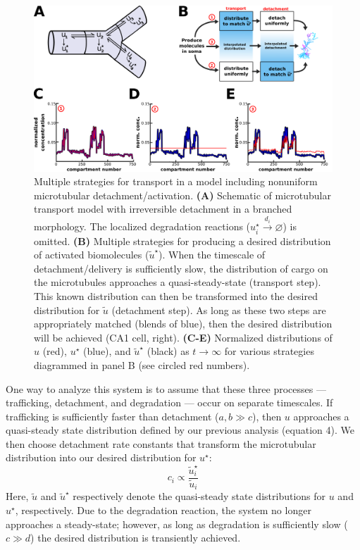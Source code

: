 \documentclass[11pt]{wlpeerj}
\begin{document}
\begin{figure}[!tb]
\begin{center}
\includegraphics[width=0.9\columnwidth]{04_sushi_belt.png}
\caption{Multiple strategies for transport in a model including nonuniform microtubular detachment/activation.
\textbf{(A)} Schematic of microtubular transport model with irreversible detachment in a branched morphology. The localized degradation reactions ($u^{\star}_i \xrightarrow{d_i} \varnothing$) is omitted.
\textbf{(B)} Multiple strategies for producing a desired distribution of activated biomolecules ($\tilde{u}^{\star}$). When the timescale of detachment/delivery is sufficiently slow, the distribution of cargo on the microtubules approaches a quasi-steady-state (transport step). This known distribution can then be transformed into the desired distribution for $\tilde{u}$ (detachment step). As long as these two steps are appropriately matched (blends of blue), then the desired distribution will be achieved (CA1 cell, right).
\textbf{(C-E)} Normalized distributions of $u$ (red), $u^\star$ (blue), and $\tilde{u}^\star$ (black) as $t \rightarrow \infty$ for various strategies diagrammed in panel B (see circled red numbers). }
\end{center}
\end{figure}

One way to analyze this system is to assume that these three processes --- trafficking, detachment, and degradation --- occur on separate timescales.
If trafficking is sufficiently faster than detachment ($a,b \gg c$), then $u$ approaches a quasi-steady state distribution defined by our previous analysis (equation 4).
We then choose detachment rate constants that transform the microtubular distribution into our desired distribution for $u^\star$:
\begin{equation}
c_i \propto \frac{\tilde{u}^\star_i}{\tilde{u}_i}
\end{equation}
Here, $\tilde{u}$ and $\tilde{u}^\star$ respectively denote the quasi-steady state distributions for $u$ and $u^\star$, respectively.
Due to the degradation reaction, the system no longer approaches a steady-state; however, as long as degradation is sufficiently slow ($c \gg d$) the desired distribution is transiently achieved.
\end{document}
